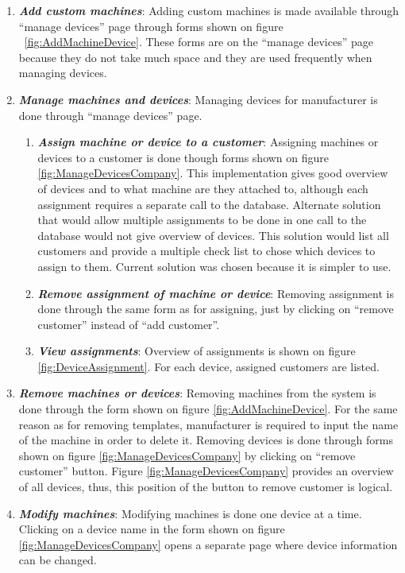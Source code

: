 \begin{enumerate}
	\item \textbf{\textit{Add custom machines}}: Adding custom machines is made available through ``manage devices'' page through forms shown on figure ~\ref{fig:AddMachineDevice}. These forms are on the ``manage devices'' page because they do not take much space and they are used frequently when managing devices.

	
	\item \textbf{\textit{Manage machines and devices}}: Managing devices for manufacturer is done through ``manage devices'' page.
		\begin{enumerate}
			\item \textbf{\textit{Assign machine or device to a customer}}: Assigning machines or devices to a customer is done though forms shown on figure \ref{fig:ManageDevicesCompany}. This implementation gives good overview of devices and to what machine are they attached to, although each assignment requires a separate call to the database. Alternate solution that would allow multiple assignments to be done in one call to the database would not give overview of devices. This solution would list all customers and provide a multiple check list to chose which devices to assign to them. Current solution was chosen because it is simpler to use.

			\item \textbf{\textit{Remove assignment of machine or device}}: Removing assignment is done through the same form as for assigning, just by clicking on ``remove customer'' instead of ``add customer''.

			\item \textbf{\textit{View assignments}}: Overview of assignments is shown on figure \ref{fig:DeviceAssignment}. For each device, assigned customers are listed.
		\end{enumerate}

	\item \textbf{\textit{Remove machines or devices}}: Removing machines from the system is done through the form shown on figure \ref{fig:AddMachineDevice}. For the same reason as for removing templates, manufacturer is required to input the name of the machine in order to delete it. Removing devices is done through forms shown on figure \ref{fig:ManageDevicesCompany} by clicking on ``remove customer'' button. Figure \ref{fig:ManageDevicesCompany} provides an overview of all devices, thus, this position of the button to remove customer is logical.

	\item \textbf{\textit{Modify machines}}: Modifying machines is done one device at a time. Clicking on a device name in the form shown on figure \ref{fig:ManageDevicesCompany} opens a separate page where device information can be changed. 

\end{enumerate}

